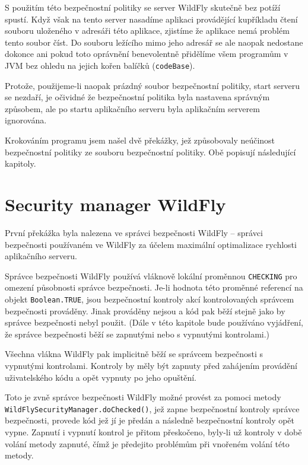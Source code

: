 S použitím této bezpečnostní politiky se server WildFly skutečně bez potíží spustí. Když však na tento server nasadíme aplikaci provádějící kupříkladu čtení souboru uloženého v adresáři této aplikace, zjistíme že aplikace nemá problém tento soubor číst. Do souboru ležícího mimo jeho adresář se ale naopak nedostane dokonce ani pokud toto oprávnění benevolentně přidělíme všem programům v JVM bez ohledu na jejich kořen balíčků ({\tt codeBase}).

Protože, použijeme-li naopak prázdný soubor bezpečnostní politiky, start serveru se nezdaří, je očividné že bezpečnostní politika byla nastavena správným způsobem, ale po startu aplikačního serveru byla aplikačním serverem ignorována.

Krokováním programu jsem našel dvě překážky, jež způsobovaly neúčinost bezpečnostní politiky ze souboru bezpečnostní politiky. Obě popisují následující kapitoly.

\section{Security manager WildFly}

První překážka byla nalezena ve správci bezpečnosti WildFly -- správci bezpečnosti používaném ve WildFly za účelem maximální optimalizace rychlosti aplikačního serveru.

Správce bezpečnosti WildFly používá vláknově lokální proměnnou {\tt CHECKING} pro omezení působnosti správce bezpečnosti. Je-li hodnota této proměnné referencí na objekt {\tt Boolean.TRUE}, jsou bezpečnostní kontroly akcí kontrolovaných správcem bezpečnosti prováděny. Jinak prováděny nejsou a kód pak běží stejně jako by správce bezpečnosti nebyl použit. \cite{sourceWildFlySecurityManager} (Dále v této kapitole bude používáno vyjádření, že správce bezpečnosti běží se zapnutými nebo s vypnutými kontrolami.)

Všechna vlákna WildFly pak implicitně běží se správcem bezpečnosti s vypnutými kontrolami. Kontroly by měly být zapnuty před zahájením provádění uživatelského kódu a opět vypnuty po jeho opuštění. \cite{sourceWildFlySecurityManager}

Toto je zvně správce bezpečnosti WildFly možné provést za pomoci metody {\tt WildFlySecurityManager.doChecked()}, jež zapne bezpečnostní kontroly správce bezpečnosti, provede kód jež jí je předán a následně bezpečnostní kontroly opět vypne. Zapnutí i vypnutí kontrol je přitom přeskočeno, byly-li už kontroly v době volání metody zapnuté, čímž je předejito problémům při vnořeném volání této metody. \cite{sourceWildFlySecurityManager}

